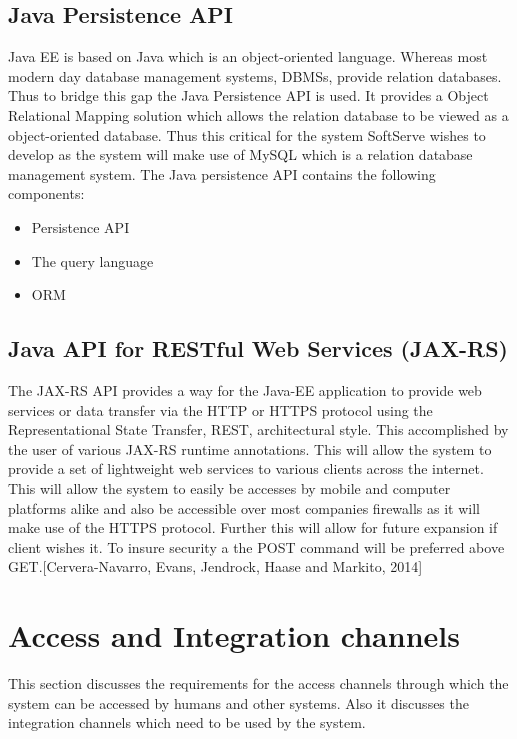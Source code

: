 \documentclass[12pt]{article}
\begin{document}
\subsection{Java Persistence API}
Java EE is based on Java which is an object-oriented language. Whereas most modern day database management systems, DBMSs, provide relation databases. Thus to bridge this gap the Java Persistence API is used. It provides a Object Relational Mapping solution which allows the relation database to be viewed as a object-oriented database. Thus this critical for the system SoftServe wishes to develop as the system will make use of MySQL which is a relation database management system. The Java persistence API contains the following components:  
\begin{itemize}
\item Persistence API
\item The query language
\item ORM
\end{itemize}

\subsection{Java API for RESTful Web Services (JAX-RS)}
The JAX-RS API provides a way for the Java-EE application to provide web services or data transfer via the HTTP or HTTPS protocol using the Representational State Transfer, REST, architectural style. This accomplished by the user of various JAX-RS runtime annotations. This will allow the system to provide a set of lightweight web services to various clients across the internet. This will allow the system to easily be accesses by mobile and computer platforms alike and also be accessible over most companies firewalls as it will make use of the HTTPS protocol. Further this will allow for future expansion if client wishes it. To insure security a the POST command will be preferred above GET.[Cervera-Navarro, Evans, Jendrock, Haase and Markito, 2014]



\section{Access and Integration channels}
This section discusses the requirements for the access channels through which the system can be accessed by humans and other systems. Also it discusses the integration channels which need to be used by the system. 
\end{document}
